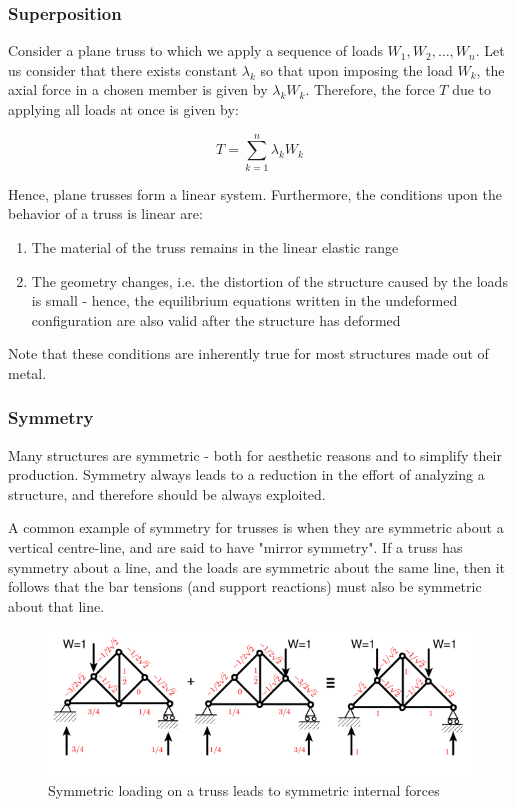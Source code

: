 \documentclass{article}
\begin{document}
\subsubsection{Superposition}

Consider a plane truss to which we apply a sequence of loads $W_1, W_2, \dots, W_n$. Let us consider that there exists constant $\lambda_k$ so that upon imposing the load $W_k$, the axial force in a chosen member is given by $\lambda_kW_k$. Therefore, the force $T$ due to applying all loads at once is given by:

\[ T = \sum_{k = 1}^n \lambda_kW_k \]

Hence, plane trusses form a linear system. Furthermore, the conditions upon the behavior of a truss is linear are:

\begin{enumerate}
    \item The material of the truss remains in the linear elastic range
    \item The geometry changes, i.e. the distortion of the structure caused by the loads is small - hence, the equilibrium equations written in the undeformed configuration are also valid after the structure has deformed
\end{enumerate}

Note that these conditions are inherently true for most structures made out of metal.

\subsubsection{Symmetry}

Many structures are symmetric - both for aesthetic reasons and to simplify their production. Symmetry always leads to a reduction in the effort of analyzing a structure, and therefore should be always exploited.

A common example of symmetry for trusses is when they are symmetric about a vertical centre-line, and are said to have "mirror symmetry". If a truss has symmetry about a line, and the loads are symmetric about the same line, then it follows that the bar tensions (and support reactions) must also be symmetric about that line.

\begin{figure}[h]
    \centering
    \includegraphics{images/symmetry.png}
    \caption{Symmetric loading on a truss leads to symmetric internal forces}
    \label{fig:enter-label}
\end{figure}
\end{document}
